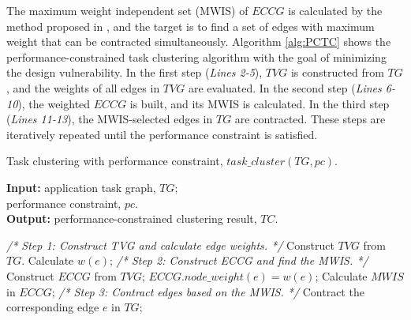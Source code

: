 \documentclass[10pt,journal, compsoc]{IEEEtran}
\begin{document}
The maximum weight independent set (MWIS) of $ECCG$ is calculated by the method proposed in \cite{conference:LC}, and the target is to find a set of edges with maximum weight that can be contracted simultaneously. Algorithm \ref{alg:PCTC} shows the performance-constrained task clustering algorithm with the goal of minimizing the design vulnerability. In the first step (\textit{Lines 2-5}), $TVG$ is constructed from $TG$, and the weights of all edges in $TVG$ are evaluated. In the second step (\textit{Lines 6-10}), the weighted $ECCG$ is built, and its MWIS is calculated. In the third step (\textit{Lines 11-13}), the MWIS-selected edges in $TG$ are contracted. These steps are iteratively repeated until the performance constraint is satisfied.


\begin{algorithm}[!t]
\caption{Task clustering with performance constraint, $task\_cluster(TG, pc)$.}
\label{alg:PCTC}
\begin{flushleft}
{\textbf{Input:}}
application task graph, $TG$;\\
\hspace*{2.8em}performance constraint, $pc$.\\
{\textbf{Output:}} performance-constrained clustering result, $TC$.
\end{flushleft}
\begin{algorithmic}[1]
\STATEx \hspace*{-\algorithmicindent}\textit{/* Step 1: Construct TVG and calculate edge weights. */}
\STATE Construct $TVG$ from $TG$.
\STATE Calculate $w(e)$;
\ENDFOR
\STATEx \hspace*{-\algorithmicindent}\textit{/* Step 2: Construct ECCG and find the MWIS. */}
\STATE Construct $ECCG$ from $TVG$;
\STATE $ECCG.node\_weight(e)=w(e)$;
\ENDFOR
\STATE Calculate $MWIS$ in $ECCG$;
\STATEx \hspace*{-\algorithmicindent}\textit{/* Step 3: Contract edges based on the MWIS. */}
    \STATE Contract the corresponding edge $e$ in $TG$;
\ENDFOR
\ENDWHILE
\end{algorithmic}
\end{algorithm}
\end{document}
